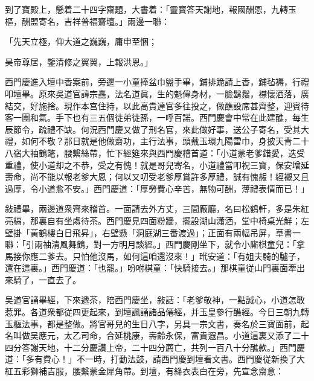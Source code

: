 到了寶殿上，懸着二十四字齋題，大書着：「靈寳答天謝地，報國酬恩，九轉玉樞，酬盟寄名，吉祥普福齋壇。」兩邊一聯：

\begin{myquote}
「先天立極，仰大道之巍巍，庸申至悃；

昊帝尊居，鑒清修之翼翼，上報洪恩。」
\end{myquote}

西門慶進入壇中香案前，旁邊一小童捧盆巾盥手畢，鋪排跪請上香，鋪毡褥，行禮叩壇畢。原來吳道官諱宗嚞，法名道眞，生的魁偉身材，一臉鬍鬚，襟懷洒落，廣結交，好施捨。現作本宫住持，以此高貴達官多往投之，做醮設席甚齊整，迎賓待客一團和氣。手下也有三五個徒弟徒孫，一呼百諾。西門慶會中常在此建醮，每生辰節令，疏禮不缺。何況西門慶又做了刑名官，來此做好事，送公子寄名，受其大禮，如何不敬？那日就是他做齋功，主行法事，頭戴玉環九陽雷巾，身披天青二十八宿大袖鶴氅，腰繫絲帶，忙下經筵來與西門慶稽首道：「小道蒙老爹錯愛，迭受重禮，使小道却之不恭，受之有愧！就是哥兒寄名，小道禮當叩祝三寳，保安增延壽命，尚不能以報老爹大恩；何以又叨受老爹厚賞許多厚禮，誠有愧赧！經襯又且過厚，令小道愈不安。」西門慶道：「厚勞費心辛苦，無物可酬，薄禮表情而已！」

敍禮畢，兩邊道衆齊來稽首。一面請去外方丈，三間厰廳，名曰松鶴軒，多是朱紅亮槅，那裏自有坐䖏待茶。西門慶見四面粉牆，擺設湖山瀟洒，堂中椅桌光鮮；左壁掛「黃鶴樓白日飛昇」，右壁懸「洞庭湖三番渡過」；正面有兩幅吊屏，草書一聯：「引兩袖清風舞鶴，對一方明月談經。」西門慶剛坐下，就令小廝棋童兒：「拿馬接你應二爹去。只怕他沒馬，如何這咱還沒來！」玳安道：「有姐夫騎的驢子，還在這裏。」西門慶道：「也罷。」吩咐棋童：「快騎接去。」那棋童従山門裏面牽出來騎了，一直去了。

吴道官誦畢經，下來遞茶，陪西門慶坐，敍話：「老爹敬神，一點誠心，小道怎敢惹罪。各道衆都従四更起來，到壇諷誦諸品僊經，并玉皇參行醮經。今日三朝九轉玉樞法事，都是整做。將官哥兒的生日八字，另具一宗文書，奏名於三寶面前，起名叫做吴應元，太乙司命，合延桃康，壽齡永保，富貴遐昌。小道這裏又添了二十四分答謝天地，十二分慶讚上帝，二十四分薦亡，共列一百八十分醮款。」西門慶道：「多有費心！」不一時，打動法鼓，請西門慶到壇看文書。西門慶従新換了大紅五彩獅補吉服，腰繫蒙金犀角帶。到壇，有絳衣表白在旁，先宣念齋意：

